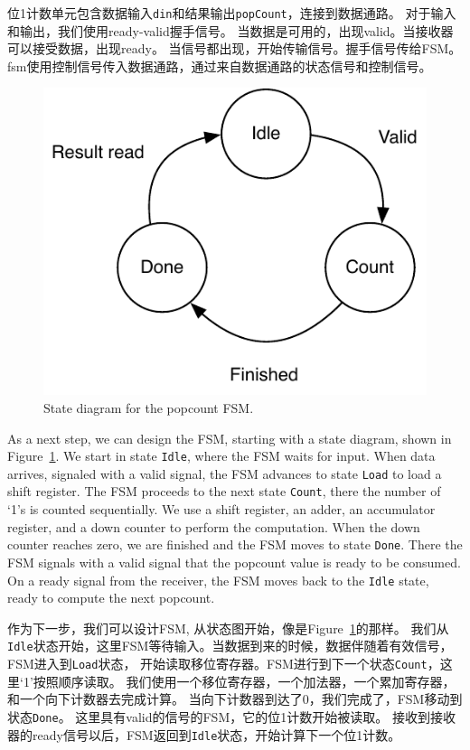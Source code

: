 \documentclass[%
    10pt,
    headinclude, footexclude,
    openright, %
    notitlepage,
    cleardoubleempty,
    headsepline,
    pointlessnumbers,
    bibtotoc, idxtotoc,
    ]{scrbook}
\newcommand{\code}[1]{{\small{\texttt{#1}}}}
\newcommand{\scale}{0.7}
\begin{document}
位1计数单元包含数据输入\code{din}和结果输出\code{popCount}，连接到数据通路。
对于输入和输出，我们使用ready-valid握手信号。
当数据是可用的，出现valid。当接收器可以接受数据，出现ready。
当信号都出现，开始传输信号。握手信号传给FSM。
fsm使用控制信号传入数据通路，通过来自数据通路的状态信号和控制信号。

\begin{figure}
  \centering
  \includegraphics[scale=\scale]{figures/popcnt-states}
  \caption{State diagram for the popcount FSM.}
  \label{fig:popcnt-states}
\end{figure}

As a next step, we can design the FSM, starting with a state diagram, shown in
Figure~\ref{fig:popcnt-states}. We start in state \code{Idle}, where the FSM waits
for input. When data arrives, signaled with a valid signal, the FSM advances to state \code{Load}
to load a shift register. The FSM proceeds to the next state \code{Count}, there the number
of `1's is counted sequentially. We use a shift register, an adder, an accumulator
register, and a down counter to perform the computation. When the down counter reaches
zero, we are finished and the FSM moves to state \code{Done}. There the FSM signals with a valid
signal that the popcount value is ready to be consumed. On a ready signal from the
receiver, the FSM moves back to the \code{Idle} state, ready to compute the next popcount.

作为下一步，我们可以设计FSM, 从状态图开始，像是Figure~\ref{fig:popcnt-states}的那样。
我们从\code{Idle}状态开始，这里FSM等待输入。当数据到来的时候，数据伴随着有效信号，FSM进入到\code{Load}状态，
开始读取移位寄存器。FSM进行到下一个状态\code{Count}，这里‘1’按照顺序读取。
我们使用一个移位寄存器，一个加法器，一个累加寄存器，和一个向下计数器去完成计算。
当向下计数器到达了0，我们完成了，FSM移动到状态\code{Done}。
这里具有valid的信号的FSM，它的位1计数开始被读取。
接收到接收器的ready信号以后，FSM返回到\code{Idle}状态，开始计算下一个位1计数。
\end{document}
